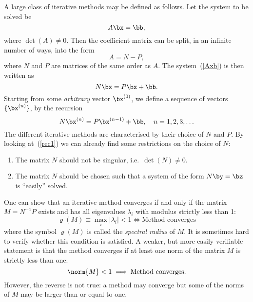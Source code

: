 A large class of iterative methods may be defined as follows.   Let
the system to be solved be
%
\begin{equation}
 A \bx = \bb , \label{Axb}
\end{equation}
%
where $\det(A) \ne 0$.   Then the coefficient matrix can be
split, in an infinite number of ways, into the form
%
\begin{equation*}
  A = N - P , 
\end{equation*}
%
where $N$ and $P$ are matrices of the same order as $A$.    The
system~(\ref{Axb}) is then written as
%
\begin{equation}
  N \bx = P \bx + \bb. \label{NxPxb}
\end{equation}
%
Starting from some \textit{arbitrary} vector $\bx^{(0)}$, we define a
sequence of vectors $\{ \bx^{(n)}\}$, by the recursion
%
\begin{equation}
  N \bx^{(n)} = P \bx^{(n-1)} + \bb, \quad n=1,2,3,\ldots 
  \label{rec1}
\end{equation}
%
The different iterative methods are characterised by their choice of
$N$ and $P$.      By looking at~(\ref{rec1}) we can already find
some restrictions on the choice of $N$:
%
\begin{enumerate}
\item The matrix $N$ should not be singular, i.e.\ $\det(N) \ne 0$. 
\item The matrix $N$ should be chosen such that a system of the form
  $N \by = \bz$ is ``easily'' solved.
\end{enumerate}
%
One can show that an iterative method converges if and only
if the matrix $M = N^{-1} P$ exists and has all eigenvalues
$\lambda_i$ with modulus strictly less than 1:
%
\begin{equation*}
  \varrho(M) \equiv \max_i | \lambda_i | < 1 \Longleftrightarrow
  \text{Method converges}
\end{equation*}
%
where the symbol $\varrho(M)$ is called the \textit{spectral radius}
of $M$.  It is sometimes hard to verify whether this condition is
satisfied.  A weaker, but more easily verifiable statement is that
the method converges if at least one norm of the matrix $M$
is strictly less than one:
%
\begin{equation*}
  \norm{ M } < 1 \implies \text{Method converges.}
\end{equation*}
%
However, the reverse is not true: a method may converge but some of
the norms of $M$ may be larger than or equal to one.

